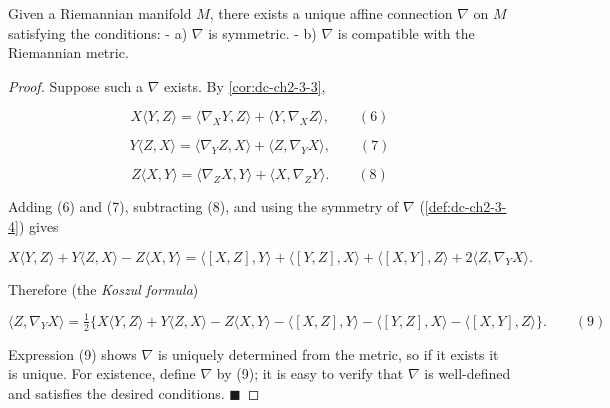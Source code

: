 \begin{theorem}
  \label{thm:dc-ch2-3-6}
  \leanok
  Given a Riemannian manifold $M$, there exists a unique affine connection $\nabla$
  on $M$ satisfying the conditions:
  - a) $\nabla$ is symmetric.
  - b) $\nabla$ is compatible with the Riemannian metric.
\end{theorem}
\begin{proof}
  \leanok
  Suppose such a $\nabla$ exists. By \cref{cor:dc-ch2-3-3},
  
  $$
  X\langle Y,Z\rangle=\langle\nabla_X Y,Z\rangle+\langle Y,\nabla_X Z\rangle,\qquad(6)
  $$
  
  $$
  Y\langle Z,X\rangle=\langle\nabla_Y Z,X\rangle+\langle Z,\nabla_Y X\rangle,\qquad(7)
  $$
  
  $$
  Z\langle X,Y\rangle=\langle\nabla_Z X,Y\rangle+\langle X,\nabla_Z Y\rangle.\qquad(8)
  $$
  
  Adding (6) and (7), subtracting (8), and using the symmetry of $\nabla$
  (\cref{def:dc-ch2-3-4}) gives
  
  $$
  X\langle Y,Z\rangle+Y\langle Z,X\rangle-Z\langle X,Y\rangle=\langle[X,Z],Y\rangle+\langle[Y,Z],X\rangle+\langle[X,Y],Z\rangle+2\langle Z,\nabla_Y X\rangle.
  $$
  
  Therefore (the \emph{Koszul formula})
  
  $$
  \langle Z,\nabla_Y X\rangle=\tfrac{1}{2}\big\{X\langle Y,Z\rangle+Y\langle Z,X\rangle-Z\langle X,Y\rangle-\langle[X,Z],Y\rangle-\langle[Y,Z],X\rangle-\langle[X,Y],Z\rangle\big\}.\qquad(9)
  $$
  
  Expression (9) shows $\nabla$ is uniquely determined from the metric, so if it
  exists it is unique. For existence, define $\nabla$ by (9); it is easy to verify
  that $\nabla$ is well-defined and satisfies the desired conditions. $\blacksquare$
\end{proof}

